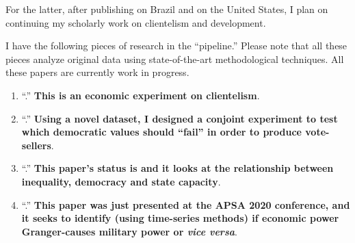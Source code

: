 \documentclass[10pt,stdletter,dateno,sigleft]{newlfm} %
\begin{document}
\begin{newlfm}
For the latter, after publishing \href{https://journals.sub.uni-hamburg.de/giga/jpla/article/view/1121/1128}{\emph{\unskip}} on Brazil and  \href{https://link.springer.com/article/10.1057/s41269-020-00174-4}{\emph{\unskip}} on the United States, I plan on continuing my scholarly work on clientelism and development. 

I have the following pieces of research in the ``pipeline.'' Please note that all these pieces analyze original data using state-of-the-art methodological techniques. All these papers are currently work in progress.

\begin{enumerate}

  \item ``\href{https://github.com/hbahamonde/Economic_Experiment_Vote_Selling/raw/master/Vote_Selling_Bahamonde_Canales_Paper.pdf}{{\unskip}}.'' {\bf This is an economic experiment on clientelism}. {\unskip}

  \item ``\href{https://github.com/hbahamonde/Conjoint_US/raw/master/Bahamonde_Quininao_Conjoint.pdf}{{\unskip}}.'' {\bf Using a novel dataset, I designed a conjoint experiment to test which democratic values should ``fail'' in order to produce vote-sellers}. {\unskip}

  \item ``\href{https://github.com/hbahamonde/Inequality_State_Capacity/raw/main/Bahamonde_Trasberg.pdf}{{\unskip}}.'' {\bf This paper's status is {\unskip} and it looks at the relationship between inequality, democracy and state capacity}. {\unskip}

  \item ``\href{https://github.com/hbahamonde/Bahamonde_Kovac/raw/master/Bahamonde_Kovac.pdf}{{\unskip}}.'' {\bf This paper was just presented at the APSA 2020 conference, and it seeks to identify (using time-series methods) if economic power Granger-causes military power or \emph{vice versa}}. {\unskip}


\end{enumerate}
\end{newlfm}
\end{document}
